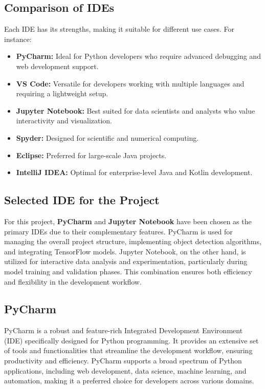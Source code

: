 \subsection{Comparison of IDEs}

Each IDE has its strengths, making it suitable for different use cases. For instance:
\begin{itemize}
	\item \textbf{PyCharm:} Ideal for Python developers who require advanced debugging and web development support.
	\item \textbf{VS Code:} Versatile for developers working with multiple languages and requiring a lightweight setup.
	\item \textbf{Jupyter Notebook:} Best suited for data scientists and analysts who value interactivity and visualization.
	\item \textbf{Spyder:} Designed for scientific and numerical computing.
	\item \textbf{Eclipse:} Preferred for large-scale Java projects.
	\item \textbf{IntelliJ IDEA:} Optimal for enterprise-level Java and Kotlin development.
\end{itemize}

\subsection{Selected IDE for the Project}

For this project, \textbf{PyCharm} and \textbf{Jupyter Notebook} have been chosen as the primary IDEs due to their complementary features. PyCharm is used for managing the overall project structure, implementing object detection algorithms, and integrating TensorFlow models. Jupyter Notebook, on the other hand, is utilized for interactive data analysis and experimentation, particularly during model training and validation phases. This combination ensures both efficiency and flexibility in the development workflow.




\subsection{PyCharm}
PyCharm is a robust and feature-rich Integrated Development Environment (IDE) specifically designed for Python programming. It provides an extensive set of tools and functionalities that streamline the development workflow, ensuring productivity and efficiency. PyCharm supports a broad spectrum of Python applications, including web development, data science, machine learning, and automation, making it a preferred choice for developers across various domains.

